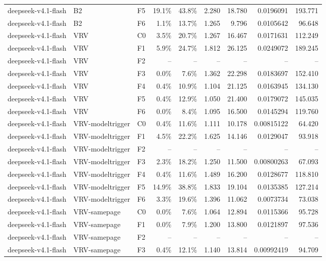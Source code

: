 \begin{tabular}{lllrrrrrr}
deepseek-v4.1-flash & B2 & F5 & 19.1\% & 43.8\% & 2.280 & 18.780 & 0.0196091 & 193.771 \\
deepseek-v4.1-flash & B2 & F6 & 1.1\% & 13.7\% & 1.265 & 9.796 & 0.0105642 & 96.648 \\
deepseek-v4.1-flash & VRV & C0 & 3.5\% & 20.7\% & 1.267 & 16.467 & 0.0171631 & 112.249 \\
deepseek-v4.1-flash & VRV & F1 & 5.9\% & 24.7\% & 1.812 & 26.125 & 0.0249072 & 189.245 \\
deepseek-v4.1-flash & VRV & F2 & -- & -- & -- & -- & -- & -- \\
deepseek-v4.1-flash & VRV & F3 & 0.0\% & 7.6\% & 1.362 & 22.298 & 0.0183697 & 152.410 \\
deepseek-v4.1-flash & VRV & F4 & 0.4\% & 10.9\% & 1.104 & 21.125 & 0.0163945 & 134.130 \\
deepseek-v4.1-flash & VRV & F5 & 0.4\% & 12.9\% & 1.050 & 21.400 & 0.0179072 & 145.035 \\
deepseek-v4.1-flash & VRV & F6 & 0.0\% & 8.4\% & 1.095 & 16.500 & 0.0145294 & 119.760 \\
deepseek-v4.1-flash & VRV-modeltrigger & C0 & 0.4\% & 11.6\% & 1.111 & 10.178 & 0.00815122 & 64.420 \\
deepseek-v4.1-flash & VRV-modeltrigger & F1 & 4.5\% & 22.2\% & 1.625 & 14.146 & 0.0129047 & 93.918 \\
deepseek-v4.1-flash & VRV-modeltrigger & F2 & -- & -- & -- & -- & -- & -- \\
deepseek-v4.1-flash & VRV-modeltrigger & F3 & 2.3\% & 18.2\% & 1.250 & 11.500 & 0.00800263 & 67.093 \\
deepseek-v4.1-flash & VRV-modeltrigger & F4 & 0.4\% & 11.6\% & 1.489 & 16.200 & 0.0128677 & 118.810 \\
deepseek-v4.1-flash & VRV-modeltrigger & F5 & 14.9\% & 38.8\% & 1.833 & 19.104 & 0.0135385 & 127.214 \\
deepseek-v4.1-flash & VRV-modeltrigger & F6 & 3.3\% & 19.6\% & 1.396 & 11.062 & 0.0073734 & 73.038 \\
deepseek-v4.1-flash & VRV-samepage & C0 & 0.0\% & 7.6\% & 1.064 & 12.894 & 0.0115366 & 95.728 \\
deepseek-v4.1-flash & VRV-samepage & F1 & 0.0\% & 7.9\% & 1.200 & 13.800 & 0.0121897 & 97.536 \\
deepseek-v4.1-flash & VRV-samepage & F2 & -- & -- & -- & -- & -- & -- \\
deepseek-v4.1-flash & VRV-samepage & F3 & 0.4\% & 12.1\% & 1.140 & 13.814 & 0.00992419 & 94.709 \\

\end{tabular}
